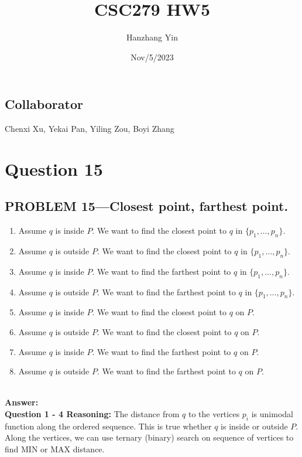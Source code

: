 \documentclass{article}
\title{CSC279 HW5}
\author{Hanzhang Yin}
\date{Nov/5/2023}
\begin{document}
\maketitle

\subsection*{Collaborator}
Chenxi Xu, Yekai Pan, Yiling Zou, Boyi Zhang

\section*{Question 15}

\subsection*{PROBLEM 15---Closest point, farthest point.}

\begin{enumerate}
    \item Assume $q$ is inside $P$. We want to find the closest point to $q$ in $\{p_1, \dots, p_n\}$.
    \item Assume $q$ is outside $P$. We want to find the closest point to $q$ in $\{p_1, \dots, p_n\}$.
    \item Assume $q$ is inside $P$. We want to find the farthest point to $q$ in $\{p_1, \dots, p_n\}$.
    \item Assume $q$ is outside $P$. We want to find the farthest point to $q$ in $\{p_1, \dots, p_n\}$.
    \item Assume $q$ is inside $P$. We want to find the closest point to $q$ on $P$.
    \item Assume $q$ is outside $P$. We want to find the closest point to $q$ on $P$.
    \item Assume $q$ is inside $P$. We want to find the farthest point to $q$ on $P$.
    \item Assume $q$ is outside $P$. We want to find the farthest point to $q$ on $P$.
\end{enumerate}
\\
\textbf{Answer: }
\\
\textbf{Question 1 - 4 Reasoning: }
The distance from $q$ to the vertices $p_i$ is unimodal function along the ordered sequence. 
This is true whether $q$ is inside or outside $P$. Along the vertices, we can use ternary (binary) search on sequence of vertices to find MIN or MAX distance.
\end{document}
